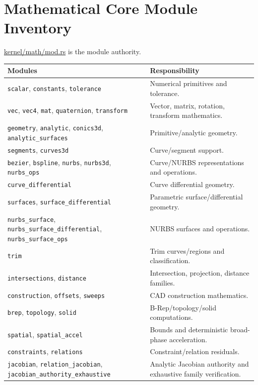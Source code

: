\documentclass[11pt,a4paper]{report}
\newcommand{\pathref}[1]{\url{#1}}
\begin{document}
\chapter{Mathematical Core Module Inventory}

\pathref{kernel/math/mod.rs} is the module authority.

\begin{longtable}{@{}p{}p{}@{}}
\toprule
Modules & Responsibility \\
\midrule
\texttt{scalar}, \texttt{constants}, \texttt{tolerance} & Numerical primitives and tolerance. \\
\texttt{vec}, \texttt{vec4}, \texttt{mat}, \texttt{quaternion}, \texttt{transform} & Vector, matrix, rotation, transform mathematics. \\
\texttt{geometry}, \texttt{analytic}, \texttt{conics3d}, \texttt{analytic\_surfaces} & Primitive/analytic geometry. \\
\texttt{segments}, \texttt{curves3d} & Curve/segment support. \\
\texttt{bezier}, \texttt{bspline}, \texttt{nurbs}, \texttt{nurbs3d}, \texttt{nurbs\_ops} & Curve/NURBS representations and operations. \\
\texttt{curve\_differential} & Curve differential geometry. \\
\texttt{surfaces}, \texttt{surface\_differential} & Parametric surface/differential geometry. \\
\texttt{nurbs\_surface}, \texttt{nurbs\_surface\_differential}, \texttt{nurbs\_surface\_ops} & NURBS surfaces and operations. \\
\texttt{trim} & Trim curves/regions and classification. \\
\texttt{intersections}, \texttt{distance} & Intersection, projection, distance families. \\
\texttt{construction}, \texttt{offsets}, \texttt{sweeps} & CAD construction mathematics. \\
\texttt{brep}, \texttt{topology}, \texttt{solid} & B-Rep/topology/solid computations. \\
\texttt{spatial}, \texttt{spatial\_accel} & Bounds and deterministic broad-phase acceleration. \\
\texttt{constraints}, \texttt{relations} & Constraint/relation residuals. \\
\texttt{jacobian}, \texttt{relation\_jacobian}, \texttt{jacobian\_authority\_exhaustive} & Analytic Jacobian authority and exhaustive family verification. \\

\end{longtable}
\end{document}
